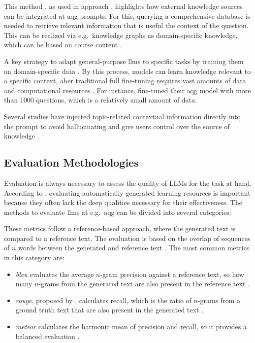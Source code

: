  This method \cite{lewis_retrieval-augmented_2020}, as used in approach \cite{hang_mcqgen_2024}, highlights how external knowledge sources can be integrated at \ac{aqg} prompts. For this, querying a comprehensive database is needed to retrieve relevant information that is useful the context of the question. This can be realized via e.g.\ knowledge graphs as domain-specific knowledge, which can be based on course content \cite{yang_heuristic_2024}.

 A key strategy to adapt general-purpose \ac{llms} to specific tasks by training them on domain-specific data \cite{hou_large_2024}. By this process, models can learn knowledge relevant to a specific context, aber traditional full fine-tuning requires vast amounts of data and computational resources \cite{hou_large_2024}. For instance, \cite{duong-trung_bloomllm_2024} fine-tuned their \ac{aqg} model with more than 1000 questions, which is a relatively small amount of data.

 Several studies \cite{biancini_multiple-choice_2024,blobstein_angel_2023,wang_towards_2022,bhowmick_automating_2023} have injected topic-related contextual information directly into the prompt to avoid hallucinating and give users control over the source of knowledge \cite{biancini_multiple-choice_2024}.

\vp

\subsection{Evaluation Methodologies}

Evaluation is always necessary to assess the quality of LLMs for the task at hand. According to \cite{doughty_comparative_2024}, evaluating automatically generated learning resources is important because they often lack the deep qualities necessary for their effectiveness.
The methods to evaluate \ac{llms} at e.g.\ \ac{aqg} can be divided into several categories:

 These metrics follow a reference-based approach, where the generated text is compared to a reference text. The evaluation is based on the overlap of sequences of $n$ words between the generated and reference text \cite{guo_survey_2024}. The most common metrics in this category are:
\begin{itemize}
   \item \textit{\ac{bleu}} \cite{papineni_bleu_2001} evaluates the average $n$-gram precision against a reference text, so how many $n$-grams from the generated text are also present in the reference text \cite{guo_survey_2024}.
   \item \textit{\ac{rouge}}, proposed by \cite{lin_rouge_2004}, calculates recall, which is the ratio of $n$-grams from a ground truth text that are also present in the generated text \cite{guo_survey_2024}.
   \item \textit{\ac{meteor}} \cite{banerjee_meteor_2005} calculates the harmonic mean of precision and recall, so it provides a balanced evaluation \cite{guo_survey_2024}.
\end{itemize}


